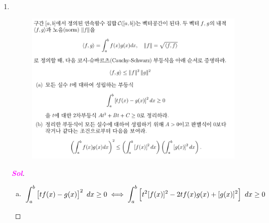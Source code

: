 \documentclass[10pt]{article}
\theoremstyle{definition}
\newcommand{\sol}{\textcolor{magenta}{\bf Sol}}
\begin{document}
\begin{enumerate}[\bf 1.]
\begin{proof}[\sol]
\begin{enumerate}[(Step 1)]
\begin{align*}
		&D:=\begin{bmatrix}
			\lambda_1&0\\0&\lambda_2
		\end{bmatrix}=\begin{bmatrix}
		3&0\\0&1
	\end{bmatrix}.
		\end{align*}
	\end{enumerate}
	By Step 1-4, hence, \[
	A=PDP^T=\begin{bmatrix}
		\frac{1}{\sqrt{2}}&\frac{1}{\sqrt{2}}\\
		\frac{1}{\sqrt{2}}&-\frac{1}{\sqrt{2}}
	\end{bmatrix}\begin{bmatrix}
	3&0\\0&1
\end{bmatrix}\begin{bmatrix}
\frac{1}{\sqrt{2}}&\frac{1}{\sqrt{2}}\\
\frac{1}{\sqrt{2}}&-\frac{1}{\sqrt{2}}
\end{bmatrix}.
	\]
\end{proof}
\newpage
\item \ \begin{figure}[h!]
	\includegraphics[scale=.325]{asgmt1_8.png}
\end{figure}
\begin{proof}[\sol]
\begin{enumerate}[(a)]
	\item \begin{align*}
		\int_a^b\sbr{tf(x)-g(x)}^2\ dx\geq0 &\iff \int_a^b\sbr{t^2[f(x)]^2-2tf(x)g(x)+[g(x)]^2}\ dx \geq 0\\

\end{align*}
\end{enumerate}
\end{proof}
\end{enumerate}
\end{document}
